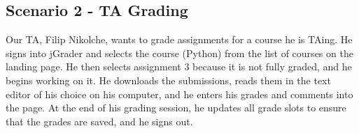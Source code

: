 \subsection{Scenario 2 - TA Grading}

Our TA, Filip Nikolche, wants to grade assignments for a course he is TAing.
He signs into jGrader and selects the course (Python) from the list of courses on the landing page. He then selects assignment 3 because it is not fully graded, and he begins working on it. He downloads the submissions, reads them in the text editor of his choice on his computer, and he enters his grades and comments into the page. At the end of his grading session, he updates all grade slots to ensure that the grades are saved, and he signs out.
